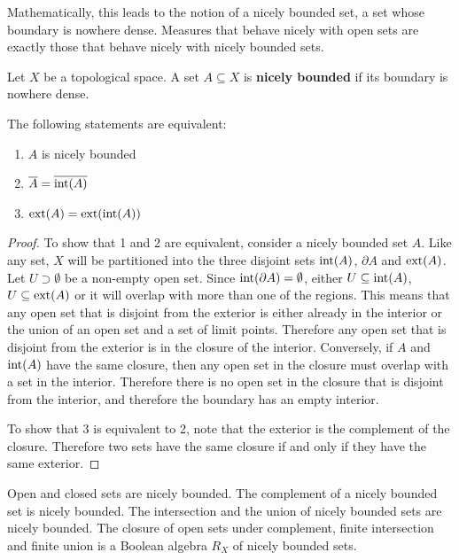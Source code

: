 Mathematically, this leads to the notion of a nicely bounded set, a set whose boundary is nowhere dense. Measures that behave nicely with open sets are exactly those that behave nicely with nicely bounded sets.

\begin{mathSection}
\begin{defn}
	Let $X$ be a topological space. A set $A \subseteq X$ is \textbf{nicely bounded} if its boundary is nowhere dense.
\end{defn}

\begin{coro}
	The following statements are equivalent:
	\begin{enumerate}
		\item $A$ is nicely bounded
		\item $\overline{A} = \overline{\operatorname{int}(A)}$
		\item $\operatorname{ext}(A) = \operatorname{ext}(\operatorname{int}(A))$
	\end{enumerate}
\end{coro}

\begin{proof}
	To show that 1 and 2 are equivalent, consider a nicely bounded set $A$. Like any set, $X$ will be partitioned into the three disjoint sets $\operatorname{int}(A)$, $\partial A$ and $\operatorname{ext}(A)$. Let $U \supset \emptyset$ be a non-empty open set. Since $\operatorname{int}(\partial A) = \emptyset$, either $U \subseteq \operatorname{int}(A)$, $U \subseteq \operatorname{ext}(A)$ or it will overlap with more than one of the regions. This means that any open set that is disjoint from the exterior is either already in the interior or the union of an open set and a set of limit points. Therefore any open set that is disjoint from the exterior is in the closure of the interior. Conversely, if $A$ and $\operatorname{int}(A)$ have the same closure, then any open set in the closure must overlap with a set in the interior. Therefore there is no open set in the closure that is disjoint from the interior, and therefore the boundary has an empty interior.
	
	To show that 3 is equivalent to 2, note that the exterior is the complement of the closure. Therefore two sets have the same closure if and only if they have the same exterior.
\end{proof}

\begin{prop}
	Open and closed sets are nicely bounded. The complement of a nicely bounded set is nicely bounded. The intersection and the union of nicely bounded sets are nicely bounded. The closure of open sets under complement, finite intersection and finite union is a Boolean algebra $R_X$ of nicely bounded sets.
\end{prop}


\end{mathSection}
